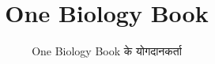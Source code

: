 \documentclass[11pt,a4paper,twoside,openany]{book}
\title{One Biology Book}
\author{One Biology Book के योगदानकर्ता}
\date{\bookdate}
\begin{document}
\frontmatter




\tableofcontents

\mainmatter





\appendix
\part{\omsolutionspart}




\backmatter
\renewcommand{\indexspace}{\par\vskip 8pt plus 4pt minus 4pt\relax}
\printindex
\end{document}

